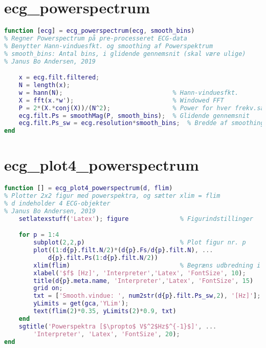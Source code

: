\documentclass[a4paper]{report}
\begin{document}
\section{ecg\_powerspectrum}

        
\begin{lstlisting}[language=Matlab, style=Matlab-editor]
function [ecg] = ecg_powerspectrum(ecg, smooth_bins)
% Regner Powerspectrum på pre-processeret ECG-data
% Benytter Hann-vinduesfkt. og smoothing af Powerspektrum
% smooth_bins: Antal bins, i glidende gennemsnit (skal være ulige)
% Janus Bo Andersen, 2019

    x = ecg.filt.filtered;
    N = length(x);
    w = hann(N);                              % Hann-vinduesfkt.
    X = fft(x.*w');                           % Windowed FFT
    P = 2*(X.*conj(X))/(N^2);                 % Power for hver frekv.sample
    ecg.filt.Ps = smoothMag(P, smooth_bins);  % Glidende gennemsnit
    ecg.filt.Ps_sw = ecg.resolution*smooth_bins;  % Bredde af smoothing, Hz
end
\end{lstlisting}



\section{ecg\_plot4\_powerspectrum}

        
\begin{lstlisting}[language=Matlab, style=Matlab-editor]
function [] = ecg_plot4_powerspectrum(d, flim)
% Plotter 2x2 figur med powerspektra, og sætter xlim = flim
% d indeholder 4 ECG-objekter
% Janus Bo Andersen, 2019
    setlatexstuff('Latex'); figure              % Figurindstillinger

    for p = 1:4
        subplot(2,2,p)                          % Plot figur nr. p
        plot((1:d{p}.filt.N/2)*(d{p}.Fs/d{p}.filt.N), ...
            d{p}.filt.Ps(1:d{p}.filt.N/2))
        xlim(flim)                              % Begræns udbredning i x
        xlabel('$f$ [Hz]', 'Interpreter','Latex', 'FontSize', 10);
        title(d{p}.meta.name, 'Interpreter','Latex', 'FontSize', 15)
        grid on;
        txt = ['Smooth.vindue: ', num2str(d{p}.filt.Ps_sw,2), '[Hz]'];
        yLimits = get(gca,'YLim');
        text(flim(2)*0.35, yLimits(2)*0.9, txt)
    end
    sgtitle('Powerspektra [$\propto$ V$^2$Hz$^{-1}$]', ...
        'Interpreter', 'Latex', 'FontSize', 20);
end
\end{lstlisting}
\end{document}
